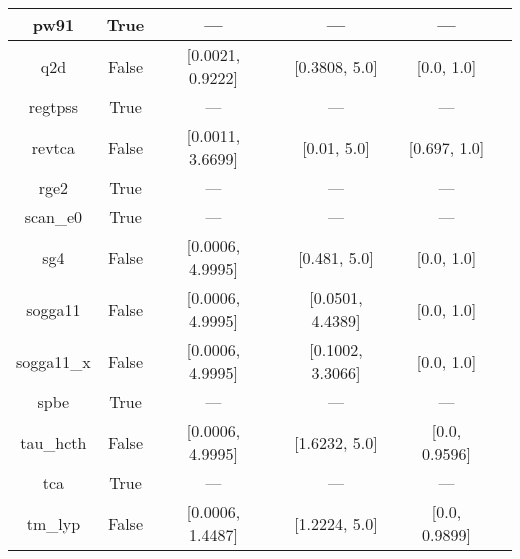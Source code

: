 \begin{tabular}{|c|c|c|c|c|l|}
          pw91 &                  True &              --- &              --- &            --- &          \cite{Perdew1991,Perdew1992_6671,Perdew1992_6671_err} \\ \hline
           q2d &                 False & [0.0021, 0.9222] &    [0.3808, 5.0] &     [0.0, 1.0] &                                       \cite{Chiodo2012_126402} \\ \hline
       regtpss &                  True &              --- &              --- &            --- &                                       \cite{Perdew2009_026403} \\ \hline
        revtca &                 False & [0.0011, 3.6699] &      [0.01, 5.0] &   [0.697, 1.0] &                                        \cite{Tognetti2008_536} \\ \hline
          rge2 &                  True &              --- &              --- &            --- &                                      \cite{Ruzsinszky2009_763} \\ \hline
      scan\_e0 &                  True &              --- &              --- &            --- &                                          \cite{Sun2015_036402} \\ \hline
           sg4 &                 False & [0.0006, 4.9995] &     [0.481, 5.0] &     [0.0, 1.0] &                                   \cite{Constantin2016_045126} \\ \hline
       sogga11 &                 False & [0.0006, 4.9995] & [0.0501, 4.4389] &     [0.0, 1.0] &                                       \cite{Peverati2011_1991} \\ \hline
    sogga11\_x &                 False & [0.0006, 4.9995] & [0.1002, 3.3066] &     [0.0, 1.0] &                                     \cite{Peverati2011_191102} \\ \hline
          spbe &                  True &              --- &              --- &            --- &                                        \cite{Swart2009_094103} \\ \hline
     tau\_hcth &                 False & [0.0006, 4.9995] &    [1.6232, 5.0] &  [0.0, 0.9596] &                                          \cite{Boese2002_9559} \\ \hline
           tca &                  True &              --- &              --- &            --- &                                     \cite{Tognetti2008_034101} \\ \hline
       tm\_lyp &                 False & [0.0006, 1.4487] &    [1.2224, 5.0] &  [0.0, 0.9899] &                                      \cite{Thakkar2009_134109} \\ \hline

\end{tabular}
